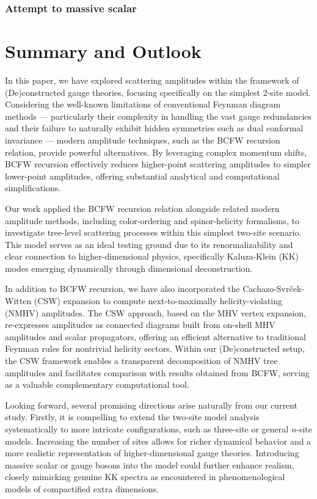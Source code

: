 \documentclass[12pt]{article}
\numberwithin{equation}{section}
\begin{document}
\subsubsection{Attempt to massive scalar}
\section{Summary and Outlook}
In this paper, we have explored scattering amplitudes within the framework of (De)constructed gauge theories, focusing specifically on the simplest 2-site model. Considering the well-known limitations of conventional Feynman diagram methods — particularly their complexity in handling the vast gauge redundancies and their failure to naturally exhibit hidden symmetries such as dual conformal invariance — modern amplitude techniques, such as the BCFW recursion relation, provide powerful alternatives. By leveraging complex momentum shifts, BCFW recursion effectively reduces higher-point scattering amplitudes to simpler lower-point amplitudes, offering substantial analytical and computational simplifications.

Our work applied the BCFW recursion relation alongside related modern amplitude methods, including color-ordering and spinor-helicity formalisms, to investigate tree-level scattering processes within this simplest two-site scenario. This model serves as an ideal testing ground due to its renormalizability and clear connection to higher-dimensional physics, specifically Kaluza-Klein (KK) modes emerging dynamically through dimensional deconstruction.

In addition to BCFW recursion, we have also incorporated the Cachazo-Svrček-Witten (CSW) expansion to compute next-to-maximally helicity-violating (NMHV) amplitudes. The CSW approach, based on the MHV vertex expansion, re-expresses amplitudes as connected diagrams built from on-shell MHV amplitudes and scalar propagators, offering an efficient alternative to traditional Feynman rules for nontrivial helicity sectors. Within our (De)constructed setup, the CSW framework enables a transparent decomposition of NMHV tree amplitudes and facilitates comparison with results obtained from BCFW, serving as a valuable complementary computational tool.

Looking forward, several promising directions arise naturally from our current study. Firstly, it is compelling to extend the two-site model analysis systematically to more intricate configurations, such as three-site or general \( n \)-site models. Increasing the number of sites allows for richer dynamical behavior and a more realistic representation of higher-dimensional gauge theories. Introducing massive scalar or gauge bosons into the model could further enhance realism, closely mimicking genuine KK spectra as encountered in phenomenological models of compactified extra dimensions.
\end{document}
